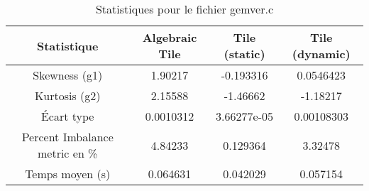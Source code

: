 \documentclass{article}
\begin{document}
\begin{table}[htbp]
  \centering
  \caption{Statistiques pour le fichier gemver.c}
  \begin{tabular}{|c|c|c|c|}
    \hline
    Statistique & Algebraic Tile & Tile (static) & Tile (dynamic) \\ 
    \hline
    Skewness (g1) & 1.90217 & -0.193316 & 0.0546423 \\ 
    Kurtosis (g2) & 2.15588 & -1.46662 & -1.18217 \\ 
    Écart type & 0.0010312 & 3.66277e-05 & 0.00108303\\ 
    Percent Imbalance metric en \% & 4.84233 & 0.129364 & 3.32478\\ 
    Temps moyen (s) & 0.064631 & 0.042029 & 0.057154 \\ 
    \hline
  \end{tabular}
\end{table}
\newpage
\end{document}
